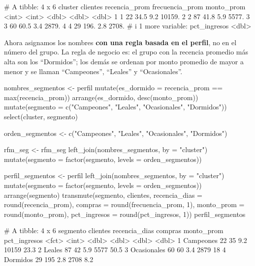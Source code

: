 \begin{rsalida}
# A tibble: 4 x 6
  cluster clientes recencia_prom frecuencia_prom monto_prom
    <int>    <int>         <dbl>           <dbl>      <dbl>
1       1       22          34.5             9.2     10159.
2       2       87          41.8             5.9      5577.
3       3       60          60.5             3.4      2879.
4       4       29         196.              2.8      2708.
# i 1 more variable: pct_ingresos <dbl>
\end{rsalida}

Ahora asignamos los nombres \textbf{con una regla basada en el perfil}, no en
el número del grupo. La regla de negocio es: el grupo con la recencia promedio
más alta son los ``Dormidos''; los demás se ordenan por monto promedio de mayor
a menor y se llaman ``Campeones'', ``Leales'' y ``Ocasionales''.

\begin{rcode}
nombres_segmentos <- perfil %
  mutate(es_dormido = recencia_prom == max(recencia_prom)) %
  arrange(es_dormido, desc(monto_prom)) %
  mutate(segmento = c("Campeones", "Leales", "Ocasionales",
                      "Dormidos")) %
  select(cluster, segmento)

orden_segmentos <- c("Campeones", "Leales", "Ocasionales", "Dormidos")

rfm_seg <- rfm_seg %
  left_join(nombres_segmentos, by = "cluster") %
  mutate(segmento = factor(segmento, levels = orden_segmentos))

perfil_segmentos <- perfil %
  left_join(nombres_segmentos, by = "cluster") %
  mutate(segmento = factor(segmento, levels = orden_segmentos)) %
  arrange(segmento) %
  transmute(segmento, clientes,
            recencia_dias = round(recencia_prom),
            compras       = round(frecuencia_prom, 1),
            monto_prom    = round(monto_prom),
            pct_ingresos  = round(pct_ingresos, 1))
perfil_segmentos
\end{rcode}

\begin{rsalida}
# A tibble: 4 x 6
  segmento    clientes recencia_dias compras monto_prom pct_ingresos
  <fct>          <int>         <dbl>   <dbl>      <dbl>        <dbl>
1 Campeones         22            35     9.2      10159         23.3
2 Leales            87            42     5.9       5577         50.5
3 Ocasionales       60            60     3.4       2879         18  
4 Dormidos          29           195     2.8       2708          8.2
\end{rsalida}

